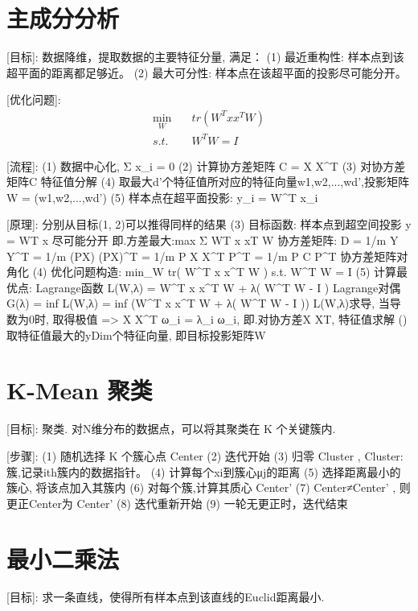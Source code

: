 \documentclass{article}
\title{}\date{} \setlength{\parindent}{0pt} \linespread{1.25}
\begin{document}
\section{主成分分析}
		[目标]:
			数据降维，提取数据的主要特征分量, 满足：
			(1) 最近重构性: 样本点到该超平面的距离都足够近。
			(2) 最大可分性: 样本点在该超平面的投影尽可能分开。
			
		[优化问题]:
    		\begin{align*}
    			\min_W  &\quad	tr( W^T x x^T W )\\
    			s.t.    &\quad	W^T W = I
    		\end{align*}
			
		[流程]:
			(1) 数据中心化, Σ \vec x_i = 0
			(2) 计算协方差矩阵 C = X X^T
			(3) 对协方差矩阵C 特征值分解
			(4) 取最大d'个特征值所对应的特征向量{w1,w2,...,wd'},投影矩阵 W = (w1,w2,...,wd')
			(5) 样本点在超平面投影: y_i = W^T x_i
			
		[原理]:
				分别从目标(1, 2)可以推得同样的结果
			(3)	目标函数: 样本点到超空间投影 y = WT x 尽可能分开
				即.方差最大:max Σ WT x xT W
				协方差矩阵:
					D = 1/m Y Y^T = 1/m (PX) (PX)^T = 1/m P X X^T P^T = 1/m P C P^T
				协方差矩阵对角化
			(4) 优化问题构造:
					min_W		tr( W^T x x^T W )
					s.t.		W^T W = I
			(5) 计算最优点:
				Lagrange函数 L(W,λ) = W^T x x^T W + λ( W^T W - I )
				Lagrange对偶 G(λ) = inf L(W,λ) = inf (W^T x x^T W + λ( W^T W - I ))
				L(W,λ)求导, 当导数为0时, 取得极值
				=>	X X^T ω_i = λ_i ω_i,
				即.对协方差X XT, 特征值求解
			()	取特征值最大的yDim个特征向量, 即目标投影矩阵W


\section{K-Mean 聚类}
		[目标]:
			聚类. 对N维分布的数据点，可以将其聚类在 K 个关键簇内.
			
		[步骤]:
			(1) 随机选择 K 个簇心点 Center
			(2) 迭代开始
				(3) 归零 Cluster , Cluster: 簇,记录ith簇内的数据指针。
				(4) 计算每个xi到簇心μj的距离
					(5) 选择距离最小的簇心, 将该点加入其簇内
				(6) 对每个簇,计算其质心 Center'
				(7) Center≠Center' , 则更正Center为 Center'
				(8) 迭代重新开始
			(9) 一轮无更正时，迭代结束

\section{最小二乘法}
		[目标]:
			求一条直线，使得所有样本点到该直线的Euclid距离最小.
			
\end{document}
